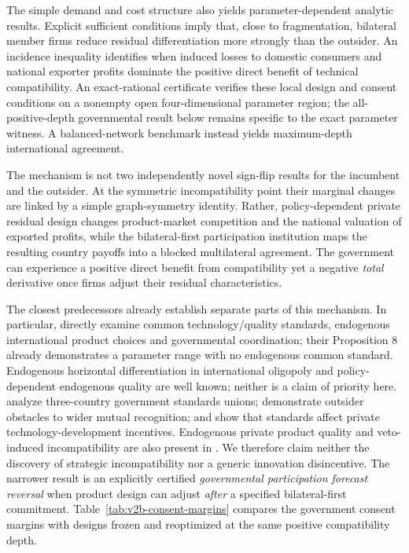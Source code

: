 The simple demand and cost structure also yields
parameter-dependent analytic results. Explicit sufficient
conditions imply that, close to fragmentation, bilateral
member firms reduce residual differentiation more strongly
than the outsider. An incidence inequality identifies when
induced losses to domestic consumers and national exporter
profits dominate the positive direct benefit of technical
compatibility. An exact-rational certificate verifies these
local design and consent conditions on a nonempty open
four-dimensional parameter region; the all-positive-depth
governmental result below remains specific to the
exact parameter witness. A balanced-network benchmark
instead yields maximum-depth international agreement.

The mechanism is not two independently novel
sign-flip results for the incumbent and the outsider.
At the symmetric incompatibility point their marginal
changes are linked by a simple graph-symmetry identity.
Rather, policy-dependent private residual design
changes product-market competition and the national
valuation of exported profits, while the
bilateral-first participation institution maps
the resulting country payoffs into a blocked
multilateral agreement. The government can experience
a positive direct benefit from compatibility yet a
negative \emph{total} derivative once firms adjust
their residual characteristics.

The closest predecessors already establish separate
parts of this mechanism. In particular,
\citet{LambertiniRossini1998} directly examine
common technology/quality standards, endogenous
international product choices and governmental
coordination; their Proposition 8 already
demonstrates a parameter range with no
endogenous common standard. Endogenous horizontal differentiation
in international oligopoly and policy-dependent endogenous
quality are well known; neither is a claim of priority here. \citet{GandalShy2001}
analyze three-country government standards unions;
\citet{TakaradaKawabata2025} demonstrate outsider
obstacles to wider mutual recognition; and
\citet{CabralSalant2014} show that standards affect
private technology-development incentives.
Endogenous private product quality and
veto-induced incompatibility are also present
in \citet{ChengHuang2025}.
We therefore claim neither the discovery of
strategic incompatibility nor a generic innovation
disincentive. The narrower result is an explicitly
certified \emph{governmental participation forecast
reversal} when product design can adjust
\emph{after} a specified bilateral-first commitment.
Table~\ref{tab:v2b-consent-margins} compares the
government consent margins with designs frozen and
reoptimized at the same positive compatibility depth.

